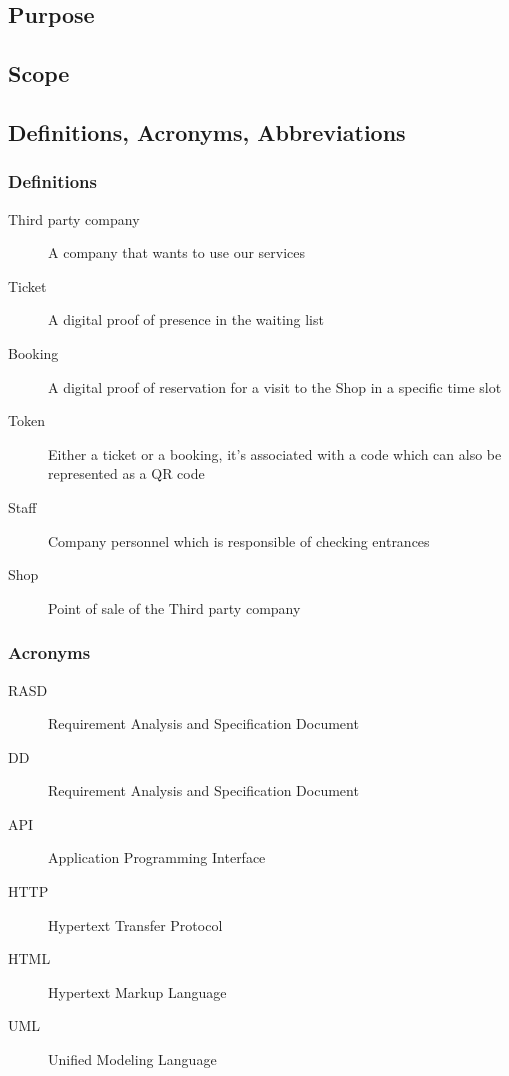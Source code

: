 \subsection{Purpose}

\subsection{Scope}

\subsection{Definitions, Acronyms, Abbreviations}
\subsubsection{Definitions}

\begin{description}
    \item [Third party company] A company that wants to use our services
    \item [Ticket] A digital proof of presence in the waiting list
    \item [Booking] A digital proof of reservation for a visit to the Shop in a specific time slot
    \item [Token] Either a ticket or a booking, it's associated with a code which can also be represented as a QR code
    \item [Staff] Company personnel which is responsible of checking entrances
    \item [Shop] Point of sale of the Third party company
\end{description}
\subsubsection{Acronyms}

\begin{description}
    \item [RASD] Requirement Analysis and Specification Document
    \item [DD] Requirement Analysis and Specification Document
    \item [API] Application Programming Interface
    \item [HTTP] Hypertext Transfer Protocol
    \item [HTML] Hypertext Markup Language
    \item [UML] Unified Modeling Language
\end{description}
